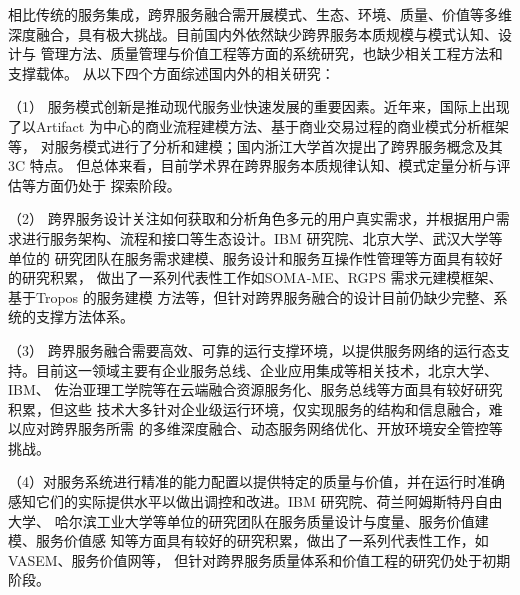 相比传统的服务集成，跨界服务融合需开展模式、生态、环境、质量、价值等多维
深度融合，具有极大挑战。目前国内外依然缺少跨界服务本质规模与模式认知、设计与
管理方法、质量管理与价值工程等方面的系统研究，也缺少相关工程方法和支撑载体。
从以下四个方面综述国内外的相关研究：

（1） 服务模式创新是推动现代服务业快速发展的重要因素。近年来，国际上出现
了以Artifact 为中心的商业流程建模方法、基于商业交易过程的商业模式分析框架等，
对服务模式进行了分析和建模；国内浙江大学首次提出了跨界服务概念及其3C 特点。
但总体来看，目前学术界在跨界服务本质规律认知、模式定量分析与评估等方面仍处于
探索阶段。

（2） 跨界服务设计关注如何获取和分析角色多元的用户真实需求，并根据用户需
求进行服务架构、流程和接口等生态设计。IBM 研究院、北京大学、武汉大学等单位的
研究团队在服务需求建模、服务设计和服务互操作性管理等方面具有较好的研究积累，
做出了一系列代表性工作如SOMA-ME、RGPS 需求元建模框架、基于Tropos 的服务建模
方法等，但针对跨界服务融合的设计目前仍缺少完整、系统的支撑方法体系。

（3） 跨界服务融合需要高效、可靠的运行支撑环境，以提供服务网络的运行态支
持。目前这一领域主要有企业服务总线、企业应用集成等相关技术，北京大学、IBM、
佐治亚理工学院等在云端融合资源服务化、服务总线等方面具有较好研究积累，但这些
技术大多针对企业级运行环境，仅实现服务的结构和信息融合，难以应对跨界服务所需
的多维深度融合、动态服务网络优化、开放环境安全管控等挑战。

（4）对服务系统进行精准的能力配置以提供特定的质量与价值，并在运行时准确
感知它们的实际提供水平以做出调控和改进。IBM 研究院、荷兰阿姆斯特丹自由大学、
哈尔滨工业大学等单位的研究团队在服务质量设计与度量、服务价值建模、服务价值感
知等方面具有较好的研究积累，做出了一系列代表性工作，如VASEM、服务价值网等，
但针对跨界服务质量体系和价值工程的研究仍处于初期阶段。

